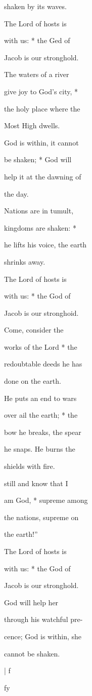 \documentclass{breviary}
\begin{document}
\begin{brevbody}
shaken by its waves.

The Lord of hosts is

with us: * the Ged of

Jacob is our stronghold.

The waters of a river

give joy to God’s city, *

the holy place where the

Most High dwells.

God is within, it cannot

be shaken; * God will

help it at the dawning of

the day.

Nations are in tumult,

kingdoms are shaken: *

he lifts his voice, the earth

shrinks away.

The Lord of hosts is

with us: * the God of

Jacob is our stronghoid.

Come, consider the

works of the Lord * the

redoubtable deeds he has

done on the earth.

He puts an end to wars

over ail the earth; * the

bow he breaks, the spear

he snaps. He burns the

shields with fire.

\resp{} still and know that I

am God, * supreme among

the nations, supreme on

the earth!”

The Lord of hosts is

with us: * the God of

Jacob is our stronghold.

God will help her

%
through his watchful pre-

cence; God is within, she

cannot be shaken.

| f

fy


\end{brevbody}
\end{document}
